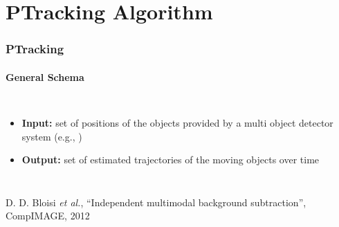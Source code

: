 \section{PTracking Algorithm}

\begin{frame}
	\frametitle{PTracking}
	\framesubtitle{General Schema}
	
	\vspace{-0.27cm}
	
	\begin{columns}[T]
		
		\vspace{0.8cm}
		
		\begin{itemize}
			\item \textbf{Input:} set of positions of the objects provided by a multi object detector
				  system (e.g., \cite{Bloisi12})
			
			\vspace{1.6cm}
			
			\item \textbf{Output:} set of estimated trajectories of the moving objects over time
		\end{itemize}
		
		\centering
		
	\end{columns}
	
	\vspace{0.3cm}
	
	\tiny
	
	\cite{Bloisi12} D. D. Bloisi \emph{et al.},  ``Independent multimodal background subtraction'',
	CompIMAGE, 2012
\end{frame}

